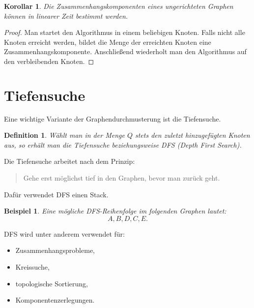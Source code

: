 \documentclass[12pt]{article}
\newtheorem{definition}[satz]{Definition}
\newtheorem{beispiel}[satz]{Beispiel}
\newtheorem{korollar}[satz]{Korollar}
\begin{document}
\begin{korollar}
Die Zusammenhangskomponenten eines ungerichteten Graphen können in linearer Zeit bestimmt werden.
\end{korollar}

\begin{proof}
Man startet den Algorithmus in einem beliebigen Knoten. Falls nicht alle Knoten erreicht werden, bildet die Menge der erreichten Knoten eine Zusammenhangskomponente. Anschließend wiederholt man den Algorithmus auf den verbleibenden Knoten.
\end{proof}

\section{Tiefensuche}

Eine wichtige Variante der Graphendurchmusterung ist die Tiefensuche.

\begin{definition}
Wählt man in der Menge \(Q\) stets den zuletzt hinzugefügten Knoten aus, so erhält man die Tiefensuche beziehungsweise DFS (\emph{Depth First Search}).
\end{definition}

Die Tiefensuche arbeitet nach dem Prinzip:
\begin{quote}
Gehe erst möglichst tief in den Graphen, bevor man zurück geht.
\end{quote}

Dafür verwendet DFS einen Stack.

\begin{beispiel}
Eine mögliche DFS-Reihenfolge im folgenden Graphen lautet:
\[
A,B,D,C,E.
\]

\begin{center}
\end{center}
\end{beispiel}

DFS wird unter anderem verwendet für:
\begin{itemize}
    \item Zusammenhangsprobleme,
    \item Kreissuche,
    \item topologische Sortierung,
    \item Komponentenzerlegungen.
\end{itemize}
\end{document}
